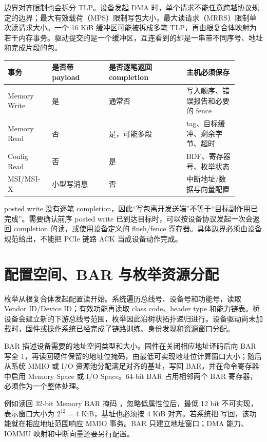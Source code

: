 边界对齐限制也会拆分 TLP。设备发起 DMA 时，单个请求不能任意跨越协议规定的边界；最大有效载荷（MPS）限制写包大小，最大读请求（MRRS）限制单次读请求大小。一个 16 KiB 缓冲区可能被拆成多笔 TLP，再由根复合体映射为若干内存事务。驱动提交的是一个缓冲区，互连看到的却是一串带不同序号、地址和完成片段的包。

\begin{longtable}{L{0.17\linewidth}L{0.22\linewidth}L{0.30\linewidth}L{0.20\linewidth}}
\toprule
事务 & 是否带 payload & 是否逐笔返回 completion & 主机必须保存 \\
\midrule
Memory Write & 是 & 通常否 & 写入顺序、错误报告和必要的 fence \\
Memory Read & 否 & 是，可能多段 & tag、目标缓冲、剩余字节、超时 \\
Config Read & 否 & 是 & BDF、寄存器号、枚举状态 \\
MSI/MSI-X & 小型写消息 & 否 & 中断地址/数据与向量配置 \\
\bottomrule
\end{longtable}

posted write 没有逐笔 completion，因此“写包离开发送端”不等于“目标副作用已完成”。需要确认前序 posted write 已到达目标时，可以按设备协议发起一次会返回 completion 的读，或使用设备定义的 flush/fence 寄存器。具体边界必须由设备规范给出，不能把 PCIe 链路 ACK 当成设备动作完成。

\section{配置空间、BAR 与枚举资源分配}

枚举从根复合体发起配置读开始。系统遍历总线号、设备号和功能号，读取 Vendor ID/Device ID；有效功能再读取 class code、header type 和能力链表。桥设备会建立新的下游总线号范围，枚举因此沿树状拓扑递归进行。设备驱动尚未加载时，固件或操作系统已经完成了链路训练、身份发现和资源窗口分配。

BAR 描述设备需要的地址空间类型和大小。固件在关闭相应地址译码后向 BAR 写全 1，再读回硬件保留的地址位掩码，由最低可实现地址位计算窗口大小；随后从系统 MMIO 或 I/O 资源池分配满足对齐的基址，写回 BAR，并在命令寄存器中启用 Memory Space 或 I/O Space。64-bit BAR 占用相邻两个 BAR 寄存器，必须作为一个整体处理。

例如读回 32-bit Memory BAR 掩码 ，忽略低属性位后，最低 12 bit 不可实现，表示窗口大小为 $2^{12}=4$ KiB，基址也必须按 4 KiB 对齐。若系统把  写回，该功能就在相应地址范围响应 MMIO 事务。BAR 只建立地址窗口；DMA 能力、IOMMU 映射和中断向量还要另行配置。

